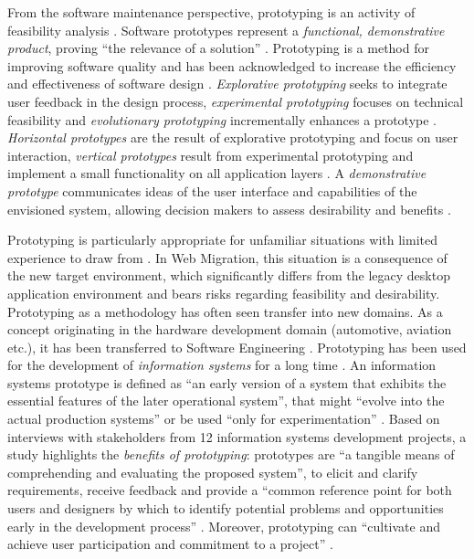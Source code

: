 From the software maintenance perspective, prototyping is an activity of feasibility analysis \autocite{IEEE1219Maintenance}.
Software prototypes represent a \emph{functional, demonstrative product}, proving ``the relevance of a solution'' \autocite{ISO/IEEE24765Vocabulary}.
Prototyping is a method for improving software quality \autocite{Wallmueller2001SoftwareQuality} and has been acknowledged to increase the efficiency and effectiveness of software design \autocite{Tripp1990}.
\emph{Explorative prototyping} seeks to integrate user feedback in the design process, \emph{experimental prototyping} focuses on technical feasibility and \emph{evolutionary prototyping} incrementally enhances a prototype \autocite{Wallmueller2001SoftwareQuality}.
\emph{Horizontal prototypes} are the result of explorative prototyping and focus on user interaction, \emph{vertical prototypes} result from experimental prototyping and implement a small functionality on all application layers \autocite{Wallmueller2001SoftwareQuality}.
A \emph{demonstrative prototype} communicates ideas of the user interface and capabilities of the envisioned system, allowing decision makers to assess desirability and benefits \autocite{Wallmueller2001SoftwareQuality}.

Prototyping is particularly appropriate for unfamiliar situations with limited experience to draw from \autocite{Tripp1990}.
In Web Migration, this situation is a consequence of the new target environment, which significantly differs from the legacy desktop application environment and bears risks regarding feasibility and desirability.
Prototyping as a methodology has often seen transfer into new domains.
As a concept originating in the hardware development domain (automotive, aviation etc.), it has been transferred to Software Engineering \autocite{Wallmueller2001SoftwareQuality}.
Prototyping has been used for the development of \emph{information systems} for a long time \autocite{Wasserman1982,Alavi1984}.
An information systems prototype is defined as ``an early version of a system that exhibits the essential features of the later operational system'', that might ``evolve into the actual production systems'' or be used ``only for experimentation'' \autocite{Alavi1984}.
Based on interviews with stakeholders from 12 information systems development projects, a study \autocite{Alavi1984} highlights the \emph{benefits of prototyping}: prototypes are ``a tangible means of comprehending and evaluating the proposed system'', to elicit and clarify requirements, receive feedback and provide a ``common reference point for both users and designers by which to identify potential problems and opportunities early in the development process'' \autocite{Alavi1984}.
Moreover, prototyping can ``cultivate and achieve user participation and commitment to a project'' \autocite{Alavi1984}.

